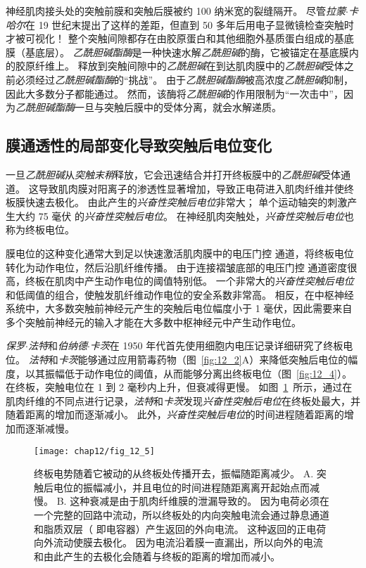 神经肌肉接头处的突触前膜和突触后膜被约 100 纳米宽的裂缝隔开。
尽管\textit{拉蒙$\cdot$卡哈尔}在 19 世纪末提出了这样的差距，但直到 50 多年后用电子显微镜检查突触时才被可视化！
整个突触间隙都存在由胶原蛋白和其他细胞外基质蛋白组成的基底膜（基底层）。
\textit{乙酰胆碱酯酶}是一种快速水解\textit{乙酰胆碱}的酶，它被锚定在基底膜内的胶原纤维上。
释放到突触间隙中的\textit{乙酰胆碱}在到达肌肉膜中的\textit{乙酰胆碱}受体之前必须经过\textit{乙酰胆碱酯酶}的“挑战”。
由于\textit{乙酰胆碱酯酶}被高浓度\textit{乙酰胆碱}抑制，因此大多数分子都能通过。
然而，该酶将\textit{乙酰胆碱}的作用限制为“一次击中”，因为\textit{乙酰胆碱酯酶}一旦与突触后膜中的受体分离，就会水解递质。



\subsection{膜通透性的局部变化导致突触后电位变化}

一旦\textit{乙酰胆碱}从\textit{突触末稍}释放，它会迅速结合并打开终板膜中的\textit{乙酰胆碱}受体通道。
这导致肌肉膜对阳离子的渗透性显著增加，导致正电荷进入肌肉纤维并使终板膜快速去极化。
由此产生的\textit{兴奋性突触后电位}非常大；
单个运动轴突的刺激产生大约 75 毫伏 的\textit{兴奋性突触后电位}。
在神经肌肉突触处，\textit{兴奋性突触后电位}也称为终板电位。


膜电位的这种变化通常大到足以快速激活肌肉膜中的电压门控  通道，将终板电位转化为动作电位，然后沿肌纤维传播。
由于连接褶皱底部的电压门控  通道密度很高，终板在肌肉中产生动作电位的阈值特别低。
一个非常大的\textit{兴奋性突触后电位}和低阈值的组合，使触发肌纤维动作电位的安全系数非常高。
相反，在中枢神经系统中，大多数突触前神经元产生的突触后电位幅度小于 1 毫伏，因此需要来自多个突触前神经元的输入才能在大多数中枢神经元中产生动作电位。


\textit{保罗$\cdot$法特}和\textit{伯纳德$\cdot$卡茨}在 1950 年代首先使用细胞内电压记录详细研究了终板电位。
\textit{法特}和\textit{卡茨}能够通过应用箭毒药物（图~\ref{fig:12_2}A）来降低突触后电位的幅度，以其振幅低于动作电位的阈值，从而能够分离出终板电位（图~\ref{fig:12_4}）。
在终板，突触电位在 1 到 2 毫秒内上升，但衰减得更慢。
如图~\ref{fig:12_5}~所示，通过在肌肉纤维的不同点进行记录，\textit{法特}和\textit{卡茨}发现\textit{兴奋性突触后电位}在终板处最大，并随着距离的增加而逐渐减小。
此外，\textit{兴奋性突触后电位}的时间进程随着距离的增加而逐渐减慢。


\begin{figure}[htbp]
	\centering
	\texttt{[image: chap12/fig\_12\_5]}
	\caption{终板电势随着它被动的从终板处传播开去，振幅随距离减少。
		A. 突触后电位的振幅减小，并且电位的时间进程随距离离开起始点而减慢。
		B. 这种衰减是由于肌肉纤维膜的泄漏导致的。
		因为电荷必须在一个完整的回路中流动，所以终板处的内向突触电流会通过静息通道和脂质双层（ 即电容器）产生返回的外向电流。 
		这种返回的正电荷向外流动使膜去极化。 
		因为电流沿着膜一直漏出，所以向外的电流和由此产生的去极化会随着与终板的距离的增加而减小。}
	\label{fig:12_5}
\end{figure}



